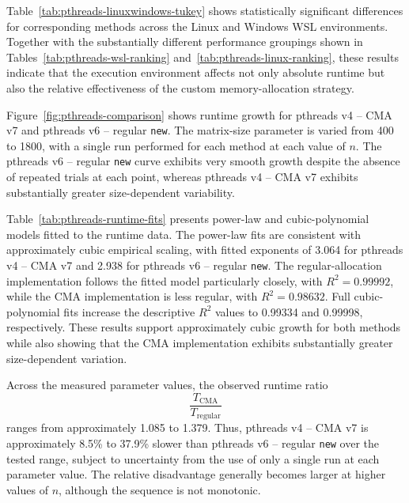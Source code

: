Table~\ref{tab:pthreads-linuxwindows-tukey} shows statistically significant differences for corresponding methods across the Linux and Windows WSL environments. Together with the substantially different performance groupings shown in Tables~\ref{tab:pthreads-wsl-ranking} and~\ref{tab:pthreads-linux-ranking}, these results indicate that the execution environment affects not only absolute runtime but also the relative effectiveness of the custom memory-allocation strategy.

Figure~\ref{fig:pthreads-comparison} shows runtime growth for pthreads v4 -- CMA v7 and pthreads v6 -- regular \texttt{new}. The matrix-size parameter is varied from 400 to 1800, with a single run performed for each method at each value of $n$. The pthreads v6 -- regular \texttt{new} curve exhibits very smooth growth despite the absence of repeated trials at each point, whereas pthreads v4 -- CMA v7 exhibits substantially greater size-dependent variability.

Table~\ref{tab:pthreads-runtime-fits} presents power-law and cubic-polynomial models fitted to the runtime data. The power-law fits are consistent with approximately cubic empirical scaling, with fitted exponents of 3.064 for pthreads v4 -- CMA v7 and 2.938 for pthreads v6 -- regular \texttt{new}. The regular-allocation implementation follows the fitted model particularly closely, with $R^2=0.99992$, while the CMA implementation is less regular, with $R^2=0.98632$. Full cubic-polynomial fits increase the descriptive $R^2$ values to 0.99334 and 0.99998, respectively. These results support approximately cubic growth for both methods while also showing that the CMA implementation exhibits substantially greater size-dependent variation.

Across the measured parameter values, the observed runtime ratio
$$
\frac{T_{\mathrm{CMA}}}{T_{\mathrm{regular}}}
$$
ranges from approximately 1.085 to 1.379. Thus, pthreads v4 -- CMA v7 is approximately 8.5\% to 37.9\% slower than pthreads v6 -- regular \texttt{new} over the tested range, subject to uncertainty from the use of only a single run at each parameter value. The relative disadvantage generally becomes larger at higher values of $n$, although the sequence is not monotonic.

